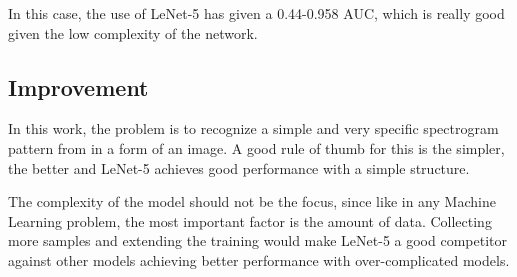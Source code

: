 \documentclass[]{article}
\begin{document}
In this case, the use of LeNet-5 has given a 0.44-0.958 AUC, which is really good given the low complexity of the network. 
\subsection{Improvement}\label{improvement}


In this work, the problem is to recognize a simple and very specific spectrogram pattern from in a form of an image. A good rule of thumb for this is the simpler, the better and LeNet-5 achieves good performance with a simple structure.  

The complexity of the model should not be the focus, since like in any Machine Learning problem, the most important factor is the amount of data. Collecting more samples and extending the training would make LeNet-5 a good competitor against other models achieving better performance with over-complicated models.
\end{document}
